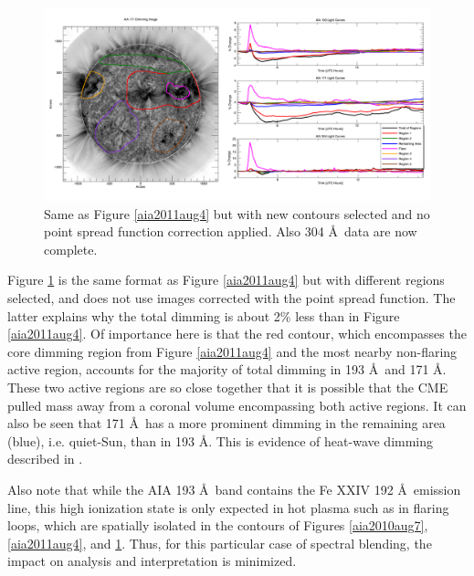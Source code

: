 \begin{figure}[!h]
    \begin{center}
	    \includegraphics[width=166mm]{Images/Aia2011Aug4NewRegions.png}
    \end{center}
    \caption[Additional AIA contour analysis for 2011 August 4 event]{
        Same as Figure \ref{aia2011aug4} but with new contours selected and no point spread function correction applied. 
        Also 304 \AA\ data are now complete. 
	}
    \label{aia2011aug4newregions}
\end{figure}

Figure \ref{aia2011aug4newregions} is the same format as Figure \ref{aia2011aug4} but with different regions selected, and does not use images corrected with the point spread function. The latter explains why the total dimming is about 2\% less than in Figure \ref{aia2011aug4}. Of importance here is that the red contour, which encompasses the core dimming region from Figure \ref{aia2011aug4} and the most nearby non-flaring active region, accounts for the majority of total dimming in 193 \AA\ and 171 \AA. These two active regions are so close together that it is possible that the CME pulled mass away from a coronal volume encompassing both active regions. It can also be seen that 171 \AA\ has a more prominent dimming in the remaining area (blue), i.e. quiet-Sun, than in 193 \AA. This is evidence of heat-wave dimming described in \citet{Robbrecht2010}. 

Also note that while the AIA 193 \AA\ band contains the Fe XXIV 192 \AA\ emission line, this high ionization state is only expected in hot plasma such as in flaring loops, which are spatially isolated in the contours of Figures \ref{aia2010aug7}, \ref{aia2011aug4}, and \ref{aia2011aug4newregions}. Thus, for this particular case of spectral blending, the impact on analysis and interpretation is minimized. 

